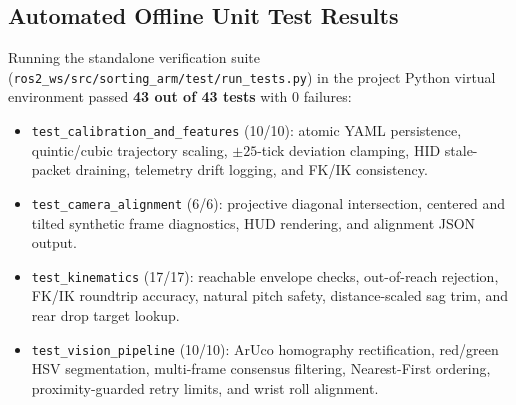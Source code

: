 \documentclass[11pt,a4paper]{article}
\begin{document}
\subsection{Automated Offline Unit Test Results}
Running the standalone verification suite (\texttt{ros2\_ws/\allowbreak src/\allowbreak sorting\_arm/\allowbreak test/\allowbreak run\_tests.py}) in the project Python virtual environment passed \textbf{43 out of 43 tests} with 0 failures:
\begin{itemize}[noitemsep]
  \item \texttt{test\_calibration\_and\_features} (10/10): atomic YAML persistence, quintic/cubic trajectory scaling, $\pm 25$-tick deviation clamping, HID stale-packet draining, telemetry drift logging, and FK/IK consistency.
  \item \texttt{test\_camera\_alignment} (6/6): projective diagonal intersection, centered and tilted synthetic frame diagnostics, HUD rendering, and alignment JSON output.
  \item \texttt{test\_kinematics} (17/17): reachable envelope checks, out-of-reach rejection, FK/IK roundtrip accuracy, natural pitch safety, distance-scaled sag trim, and rear drop target lookup.
  \item \texttt{test\_vision\_pipeline} (10/10): ArUco homography rectification, red/green HSV segmentation, multi-frame consensus filtering, Nearest-First ordering, proximity-guarded retry limits, and wrist roll alignment.
\end{itemize}
\end{document}
